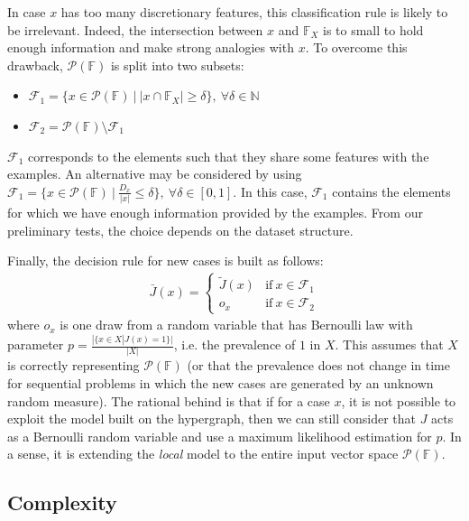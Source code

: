 \documentclass[sigconf,edbt]{acmart-edbt-workshops}
\begin{document}
In case $x$ has too many discretionary features, this classification rule is likely to be irrelevant. Indeed, the intersection between $x$ and $\mathbb{F}_X$ is to small to hold enough information and make strong analogies with $x$. To overcome this drawback, $\mathcal P({\mathbb F})$ is split into two subsets:
\begin{itemize}
  \item $\mathcal{F}_1 = \{ x \in \mathcal P({\mathbb F}) ~ | ~ |x \cap \mathbb{F}_X| \geq \delta\}, ~ \forall \delta \in \mathbb{N}$
  \item $\mathcal{F}_2 = \mathcal P({\mathbb F}) \setminus \mathcal{F}_1$
\end{itemize}
$\mathcal{F}_1$ corresponds to the elements such that they share some features with the examples. An alternative may be considered by using $\mathcal{F}_1 = \{ x \in \mathcal P({\mathbb F}) ~ | ~ \frac{D_x}{|x|} \leq \delta\}, ~ \forall \delta \in [0,1]$. In this case, $\mathcal{F}_1$ contains the elements for which we have enough information provided by the examples. From our preliminary tests, the choice depends on the dataset structure.

Finally, the decision rule for new cases is built as follows:
\begin{align}
\tag{R2} \label{eqn:updated_cr}
 \bar J(x) = \left\{\begin{matrix}
 \tilde J(x) & \text{if} ~ x \in \mathcal{F}_1 \\
 o_x & \text{if} ~ x \in \mathcal{F}_2
\end{matrix}\right.
\end{align} where $o_x$ is one draw from a random variable that has Bernoulli law with parameter $p=\frac{|\{x \in X | J(x) = 1 \}|}{|X|}$, i.e. the prevalence of $1$ in $X$. This assumes that $X$ is correctly representing $\mathcal P({\mathbb F})$ (or that the prevalence does not change in time for sequential problems in which the new cases are generated by an unknown random measure). The rational behind is that if for a case $x$, it is not possible to exploit the model built on the hypergraph, then we can still consider that $J$ acts as a Bernoulli random variable and use a maximum likelihood estimation for $p$. In a sense, it is extending the {\it local} model to the entire input vector space $\mathcal{P}(\mathbb F)$.


\subsection{Complexity}
\label{sec:complexity}
\end{document}
